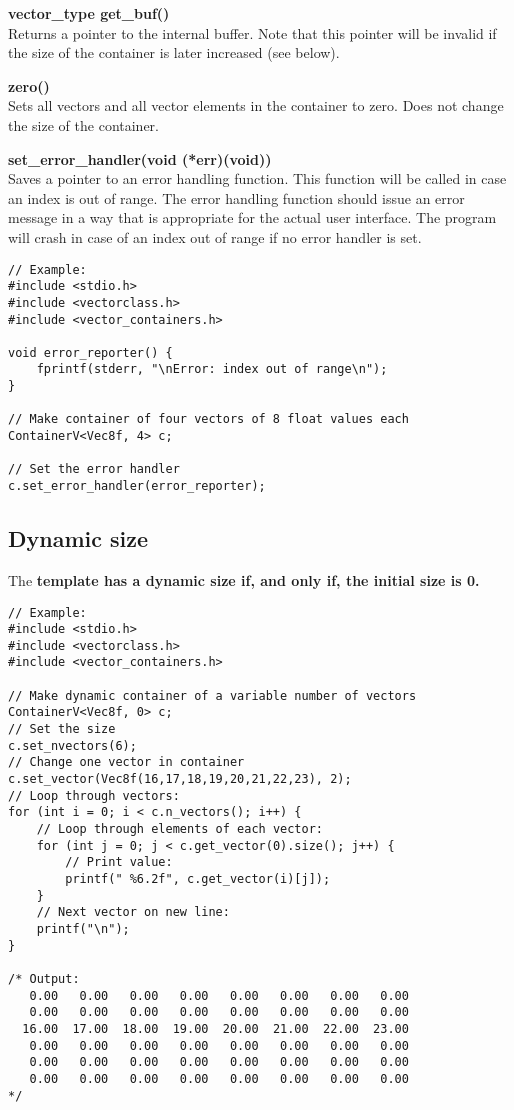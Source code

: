 \documentclass[11pt,a4paper,oneside,openright]{report}
\newcommand{\vspacesmall}{\vspace{3mm}}
\newcommand{\vspacebig}{\vspace{6mm}}
\newcommand{\codei}[1]{\bfseries \ttfamily{#1}\normalfont}
\begin{document}
{\bfseries vector\_type get\_buf()}\\
Returns a pointer to the internal buffer. Note that this pointer will be invalid if the size of the container is later increased (see below).
\vspacebig

{\bfseries zero()}\\
Sets all vectors and all vector elements in the container to zero. Does not change the size of the container.
\vspacebig

{\bfseries set\_error\_handler(void ({*}err)(void))}\\
Saves a pointer to an error handling function. This function will be called in case an index is out of range. The error handling function should issue an error message in a way that is appropriate for the actual user interface. The program will crash in case of an index out of range if no error handler is set.

\begin{lstlisting}[frame=none]
// Example:
#include <stdio.h>
#include <vectorclass.h>
#include <vector_containers.h>

void error_reporter() {
    fprintf(stderr, "\nError: index out of range\n");
}

// Make container of four vectors of 8 float values each
ContainerV<Vec8f, 4> c;

// Set the error handler
c.set_error_handler(error_reporter);

\end{lstlisting}
\vspacebig


\subsection{Dynamic size} \label{ContainerVDynamicSize}
The \codei{ContainerV} template has a dynamic size if, and only if, the initial size is 0.
\vspacesmall

\begin{lstlisting}[frame=none]
// Example:
#include <stdio.h>
#include <vectorclass.h>
#include <vector_containers.h>

// Make dynamic container of a variable number of vectors
ContainerV<Vec8f, 0> c;
// Set the size
c.set_nvectors(6);
// Change one vector in container
c.set_vector(Vec8f(16,17,18,19,20,21,22,23), 2);
// Loop through vectors:
for (int i = 0; i < c.n_vectors(); i++) { 
    // Loop through elements of each vector:
    for (int j = 0; j < c.get_vector(0).size(); j++) {
        // Print value:
        printf(" %6.2f", c.get_vector(i)[j]);
    }
    // Next vector on new line:
    printf("\n");    
}

/* Output:
   0.00   0.00   0.00   0.00   0.00   0.00   0.00   0.00
   0.00   0.00   0.00   0.00   0.00   0.00   0.00   0.00
  16.00  17.00  18.00  19.00  20.00  21.00  22.00  23.00
   0.00   0.00   0.00   0.00   0.00   0.00   0.00   0.00
   0.00   0.00   0.00   0.00   0.00   0.00   0.00   0.00
   0.00   0.00   0.00   0.00   0.00   0.00   0.00   0.00
*/
\end{lstlisting}
\vspacebig
\end{document}
